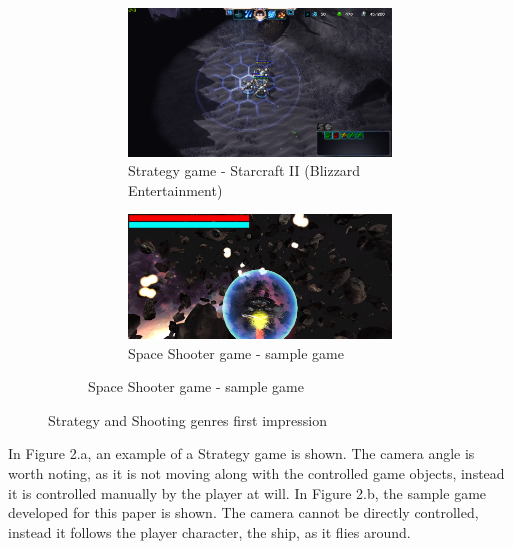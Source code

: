 \begin{figure}
\centering
\begin{subfigure}{0.49\textwidth}
\begin{subfigure}{0.49\textwidth}
\centering
\includegraphics[width = \textwidth, height = 0.66\textwidth]{images/sc2}
\caption{Strategy game - Starcraft II (Blizzard Entertainment)}
\label{fig:left}
\end{subfigure}
\begin{subfigure}{0.49\textwidth}
\centering
\includegraphics[width = \textwidth, height = 0.66\textwidth]{images/spaceshooter}
\caption{Space Shooter game - sample game}
\label{fig:right}
\end{subfigure}
\end{subfigure}
\caption{Strategy and Shooting genres first impression}
\label{fig:combined}
\end{figure}
In Figure 2.a, an example of a Strategy game is shown. The camera angle is worth noting, as it is not moving along with the controlled game objects, instead it is controlled manually by the player at will. In Figure 2.b, the sample game developed for this paper is shown. The camera cannot be directly controlled, instead it follows the player character, the ship, as it flies around. \\ \\
